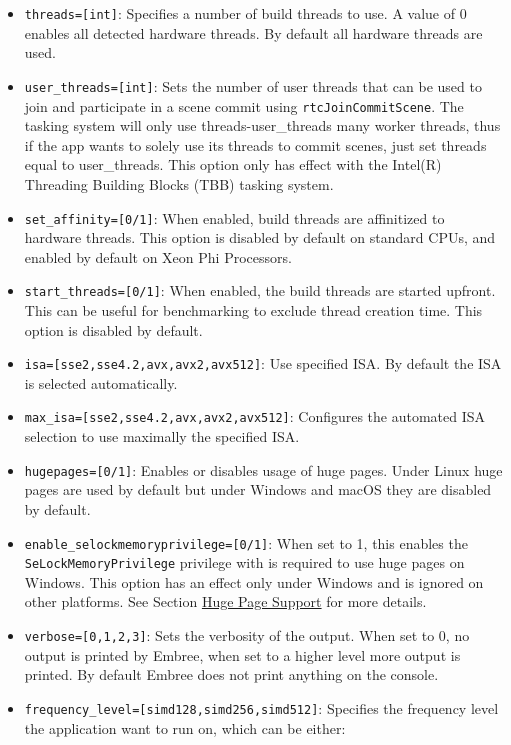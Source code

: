 \begin{itemize}
\item
  \texttt{threads={[}int{]}}: Specifies a number of build threads to
  use. A value of 0 enables all detected hardware threads. By default
  all hardware threads are used.
\item
  \texttt{user\_threads={[}int{]}}: Sets the number of user threads that
  can be used to join and participate in a scene commit using
  \texttt{rtcJoinCommitScene}. The tasking system will only use
  threads-user\_threads many worker threads, thus if the app wants to
  solely use its threads to commit scenes, just set threads equal to
  user\_threads. This option only has effect with the Intel(R) Threading
  Building Blocks (TBB) tasking system.
\item
  \texttt{set\_affinity={[}0/1{]}}: When enabled, build threads are
  affinitized to hardware threads. This option is disabled by default on
  standard CPUs, and enabled by default on Xeon Phi Processors.
\item
  \texttt{start\_threads={[}0/1{]}}: When enabled, the build threads are
  started upfront. This can be useful for benchmarking to exclude thread
  creation time. This option is disabled by default.
\item
  \texttt{isa={[}sse2,sse4.2,avx,avx2,avx512{]}}: Use specified ISA. By
  default the ISA is selected automatically.
\item
  \texttt{max\_isa={[}sse2,sse4.2,avx,avx2,avx512{]}}: Configures the
  automated ISA selection to use maximally the specified ISA.
\item
  \texttt{hugepages={[}0/1{]}}: Enables or disables usage of huge pages.
  Under Linux huge pages are used by default but under Windows and macOS
  they are disabled by default.
\item
  \texttt{enable\_selockmemoryprivilege={[}0/1{]}}: When set to 1, this
  enables the \texttt{SeLockMemoryPrivilege} privilege with is required
  to use huge pages on Windows. This option has an effect only under
  Windows and is ignored on other platforms. See Section
  \hyperref[huge-page-support]{Huge Page Support} for more details.
\item
  \texttt{verbose={[}0,1,2,3{]}}: Sets the verbosity of the output. When
  set to 0, no output is printed by Embree, when set to a higher level
  more output is printed. By default Embree does not print anything on
  the console.
\item
  \texttt{frequency\_level={[}simd128,simd256,simd512{]}}: Specifies the
  frequency level the application want to run on, which can be either:


\end{itemize}
